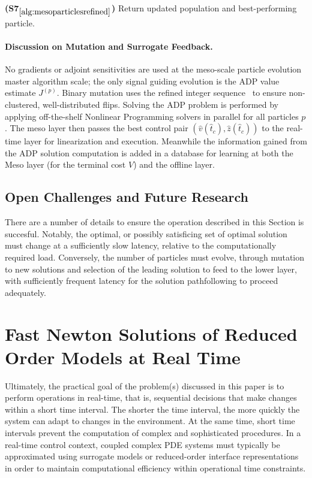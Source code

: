 \documentclass{article}
\newcommand{\1}{\mathds{1}}          %
\theoremstyle{definition}
\begin{document}
\begin{sloppypar}
\begin{algorithm}[H]
\begin{algorithmic}
		\EndFor
		
		\Statex \textbf{(S7$_{\ref{alg:mesoparticlesrefined}}$)} 
		Return updated population and best-performing particle.
	\end{algorithmic}
\end{algorithm}

\paragraph{Discussion on Mutation and Surrogate Feedback.}
No gradients or adjoint sensitivities are used at the meso-scale particle evolution master algorithm scale; the only signal guiding 
evolution is the ADP value estimate $J^{(p)}$.  
Binary mutation uses the refined integer sequence~\cite{MATRS} to ensure 
non-clustered, well-distributed flips.  
Solving the ADP problem is performed by applying off-the-shelf Nonlinear Programming solvers in parallel for all particles $p$. The meso layer then passes the best control pair $(\hat v(\hat t_c),\hat z(\hat t_c))$ to the real-time layer for linearization and execution. Meanwhile the information gained from the ADP solution computation is added in a database for learning  at both the Meso layer (for the terminal cost $V$) and the offline layer. 

\subsection{Open Challenges and Future Research}

There are a number of details to ensure the operation described in this Section is succesful. Notably, the optimal, or possibly satisficing set of optimal solution must change at a sufficiently slow latency, relative to the computationally required load. Conversely, the number of particles must evolve, through mutation to new solutions and selection of the leading solution to feed to the lower layer, with sufficiently frequent latency for the solution pathfollowing to proceed adequately. 


\section{Fast Newton Solutions of Reduced Order Models at Real Time}

Ultimately, the practical goal of the problem(s) discussed in this paper is to perform operations in real-time, that is, sequential decisions that make changes within a short time interval. The shorter the time interval, the more quickly the system can adapt to changes in the environment. At the same time, short time intervals prevent the computation of complex and sophisticated procedures. In a real-time control context, coupled complex PDE systems must typically be approximated using surrogate models or reduced-order interface representations in order to maintain computational efficiency within operational time constraints.


\end{sloppypar}
\end{document}
